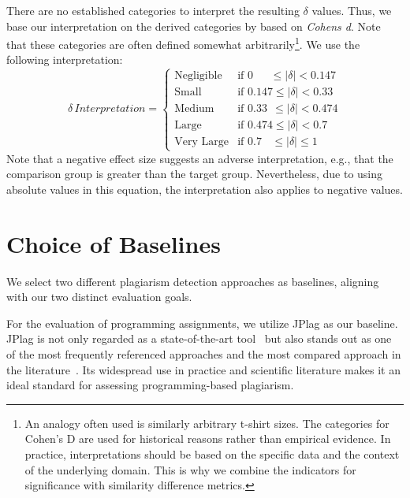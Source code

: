 There are no established categories to interpret the resulting $\delta$ values. Thus, we base our interpretation on the derived categories by \citet{Romano2006} based on \textit{Cohens d}.
Note that these categories are often defined somewhat arbitrarily\footnote{An analogy often used is similarly arbitrary t-shirt sizes. The categories for Cohen's D are used for historical reasons rather than empirical evidence. In practice, interpretations should be based on the specific data and the context of the underlying domain. This is why we combine the indicators for significance with similarity difference metrics.}. We use the following interpretation:
\begin{equation}
    \delta \, \textit{Interpretation}=
    \begin{cases}
        \text{Negligible} & \text{if } 0\ \ \ \ \ \ \ \leq \lvert \delta \rvert < 0.147 \\
        \text{Small} & \text{if } 0.147  \leq \lvert \delta \rvert < 0.33 \\
        \text{Medium} & \text{if } 0.33 \ \ \leq \lvert \delta \rvert < 0.474 \\
        \text{Large} & \text{if } 0.474  \leq \lvert \delta \rvert < 0.7 \\
        \text{Very Large} & \text{if } 0.7 \ \ \ \ \leq \lvert \delta \rvert \leq 1
    \end{cases}
\end{equation}
Note that a negative effect size suggests an adverse interpretation, e.g., that the comparison group is greater than the target group. Nevertheless, due to using absolute values in this equation, the interpretation also applies to negative values.

\section{Choice of Baselines}\label{sec:baselines}
We select two different plagiarism detection approaches as baselines, aligning with our two distinct evaluation goals.

For the evaluation of programming assignments, we utilize JPlag as our baseline. JPlag is not only regarded as a state-of-the-art tool~\cite{Aniceto2021, Novak2019} but also stands out as one of the most frequently referenced approaches and the most compared approach in the literature~\cite{Novak2019}. Its widespread use in practice and scientific literature makes it an ideal standard for assessing programming-based plagiarism.

